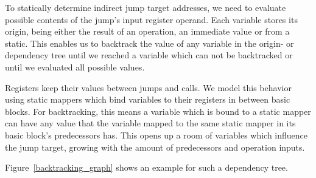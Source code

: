 \documentclass[course=eragp]{aspdoc}
\begin{document}
\par

To statically determine indirect jump target addresses, we need to evaluate possible contents of
the jump's input register operand. Each variable stores its origin, being either the result of an
operation, an immediate value or from a static. This enables us to backtrack the value of
any variable in the origin- or dependency tree until we reached a variable which can not be backtracked or until we evaluated
all possible values.

\par

Registers keep their values between jumps and calls. We model this behavior using static mappers
which bind variables to their registers in between basic blocks. For backtracking, this means a
variable which is bound to a static mapper can have any value that the variable mapped to the same
static mapper in its basic block's predecessors has. This opens up a room of variables which
influence the jump target, growing with the amount of predecessors and operation inputs.

\par

Figure~\ref{backtracking_graph} shows an example for such a dependency tree.
\end{document}
